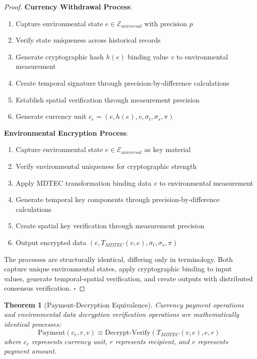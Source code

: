 \documentclass[12pt,a4paper]{article}
\newtheorem{theorem}{Theorem}
\begin{document}
\begin{proof}
\textbf{Currency Withdrawal Process}:
\begin{enumerate}
\item Capture environmental state $e \in \mathcal{E}_{universal}$ with precision $p$
\item Verify state uniqueness across historical records
\item Generate cryptographic hash $h(e)$ binding value $v$ to environmental measurement
\item Create temporal signature through precision-by-difference calculations
\item Establish spatial verification through measurement precision
\item Generate currency unit $c_e = (e, h(e), v, \sigma_t, \sigma_s, \pi)$
\end{enumerate}

\textbf{Environmental Encryption Process}:
\begin{enumerate}
\item Capture environmental state $e \in \mathcal{E}_{universal}$ as key material
\item Verify environmental uniqueness for cryptographic strength
\item Apply MDTEC transformation binding data $v$ to environmental measurement
\item Generate temporal key components through precision-by-difference calculations
\item Create spatial key verification through measurement precision
\item Output encrypted data $(e, T_{MDTEC}(v,e), \sigma_t, \sigma_s, \pi)$
\end{enumerate}

The processes are structurally identical, differing only in terminology. Both capture unique environmental states, apply cryptographic binding to input values, generate temporal-spatial verification, and create outputs with distributed consensus verification. $\square$
\end{proof}

\begin{theorem}[Payment-Decryption Equivalence]
Currency payment operations and environmental data decryption verification operations are mathematically identical processes:
\begin{equation}
\text{Payment}(c_e, r, v) \equiv \text{Decrypt-Verify}(T_{MDTEC}(v,e), e, r)
\end{equation}
where $c_e$ represents currency unit, $r$ represents recipient, and $v$ represents payment amount.
\end{theorem}
\end{document}
